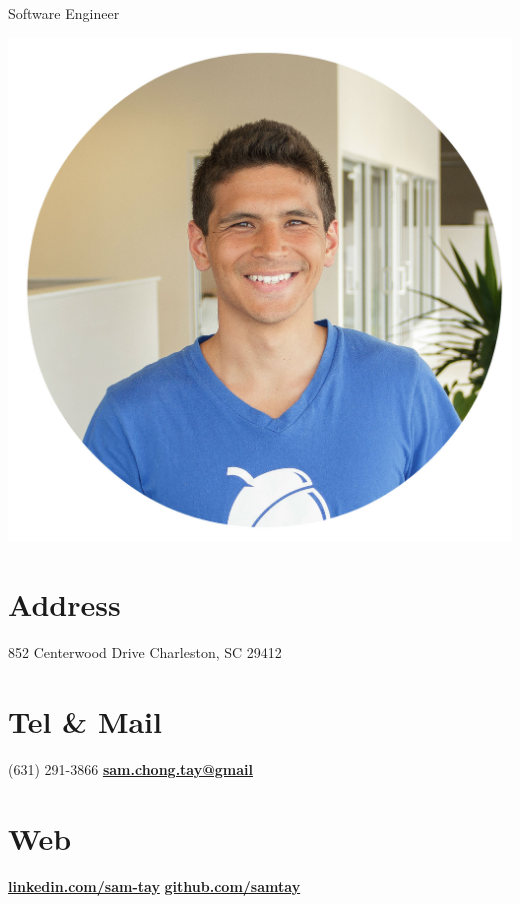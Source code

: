 \documentclass[]{friggeri-cv}
\begin{document}
      {Software Engineer}
      

\begin{aside}
  \includegraphics[scale=0.071]{img/samtay2.jpg}
  \section{Address}
    852 Centerwood Drive
    Charleston, SC 29412
    ~
  \section{Tel \& Mail}
    (631) 291-3866
    \href{mailto:sam.chong.tay@gmail.com}{\textbf{sam.chong.tay@gmail}}
    ~
  \section{Web}
    \href{https://www.linkedin.com/in/sam-tay}{\textbf{linkedin.com/sam-tay}}
    \href{https://github.com/samtay}{\textbf{github.com/samtay}}
    ~

\end{aside}
\end{document}
